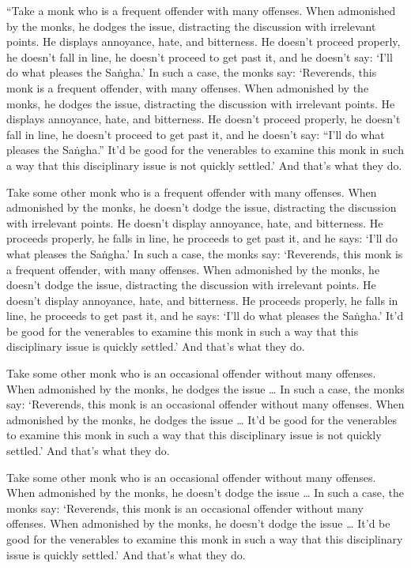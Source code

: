 \documentclass[12pt,openany]{book}%
\begin{document}
“Take a monk who is a frequent offender with many offenses. When admonished by the monks, he dodges the issue, distracting the discussion with irrelevant points. He displays annoyance, hate, and bitterness. He doesn’t proceed properly, he doesn’t fall in line, he doesn’t proceed to get past it, and he doesn’t say: ‘I’ll do what pleases the \textsanskrit{Saṅgha}.’ In such a case, the monks say: ‘Reverends, this monk is a frequent offender, with many offenses. When admonished by the monks, he dodges the issue, distracting the discussion with irrelevant points. He displays annoyance, hate, and bitterness. He doesn’t proceed properly, he doesn’t fall in line, he doesn’t proceed to get past it, and he doesn’t say: “I’ll do what pleases the \textsanskrit{Saṅgha}.” It’d be good for the venerables to examine this monk in such a way that this disciplinary issue is not quickly settled.’ And that’s what they do. 

Take some other monk who is a frequent offender with many offenses. When admonished by the monks, he doesn’t dodge the issue, distracting the discussion with irrelevant points. He doesn’t display annoyance, hate, and bitterness. He proceeds properly, he falls in line, he proceeds to get past it, and he says: ‘I’ll do what pleases the \textsanskrit{Saṅgha}.’ In such a case, the monks say: ‘Reverends, this monk is a frequent offender, with many offenses. When admonished by the monks, he doesn’t dodge the issue, distracting the discussion with irrelevant points. He doesn’t display annoyance, hate, and bitterness. He proceeds properly, he falls in line, he proceeds to get past it, and he says: ‘I’ll do what pleases the \textsanskrit{Saṅgha}.’ It’d be good for the venerables to examine this monk in such a way that this disciplinary issue is quickly settled.’ And that’s what they do. 

Take some other monk who is an occasional offender without many offenses. When admonished by the monks, he dodges the issue … In such a case, the monks say: ‘Reverends, this monk is an occasional offender without many offenses. When admonished by the monks, he dodges the issue … It’d be good for the venerables to examine this monk in such a way that this disciplinary issue is not quickly settled.’ And that’s what they do. 

Take some other monk who is an occasional offender without many offenses. When admonished by the monks, he doesn’t dodge the issue … In such a case, the monks say: ‘Reverends, this monk is an occasional offender without many offenses. When admonished by the monks, he doesn’t dodge the issue … It’d be good for the venerables to examine this monk in such a way that this disciplinary issue is quickly settled.’ And that’s what they do. 
\end{document}

